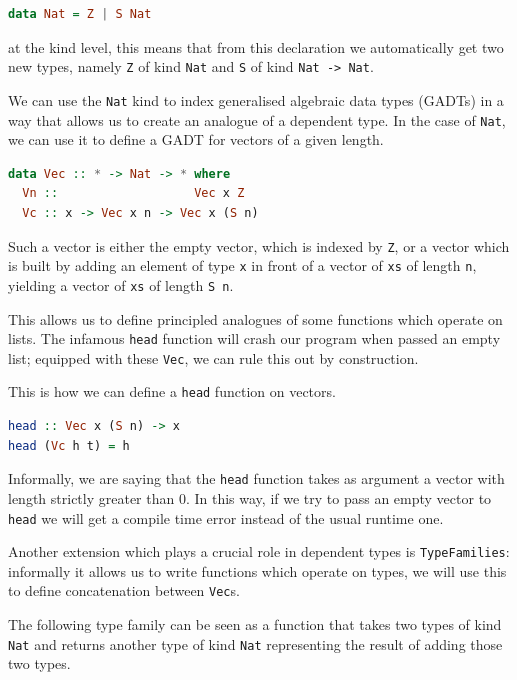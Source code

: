 \documentclass[11pt]{article}
\begin{document}
\begin{lstlisting}[language=haskell]
data Nat = Z | S Nat
\end{lstlisting}

at the kind level, this means that from this declaration we automatically get two new types, namely \texttt{Z} of kind \texttt{Nat}
and \texttt{S} of kind \texttt{Nat\ -\textgreater{}\ Nat}.

We can use the \texttt{Nat} kind to index generalised algebraic data
types (GADTs) in a way that allows us to create an analogue of a
dependent type. In the case of \texttt{Nat}, we can use it to define a
GADT for vectors of a given length.

\begin{lstlisting}[language=haskell]
data Vec :: * -> Nat -> * where
  Vn ::                   Vec x Z
  Vc :: x -> Vec x n -> Vec x (S n)
\end{lstlisting}

Such a vector is either the empty vector, which is indexed by
\texttt{Z}, or a vector which is built by adding an element of
type \texttt{x} in front of a vector of \texttt{xs} of length \texttt{n},
yielding a vector of \texttt{xs} of length \texttt{S\ n}.

This allows us to define principled analogues of some functions which
operate on lists. The infamous \texttt{head} function will
crash our program when passed an empty list; equipped with these \texttt{Vec}, we can rule this
out by construction. 

This is how we can define a \texttt{head} function on vectors.

\begin{lstlisting}[language=haskell]
head :: Vec x (S n) -> x
head (Vc h t) = h
\end{lstlisting}

Informally, we are saying that the \texttt{head} function takes as
argument a vector with length strictly greater than 0. In this way, if we
try to pass an empty vector to \texttt{head} we will get a compile time
error instead of the usual runtime one.

Another extension which plays a crucial role in dependent types is
\texttt{TypeFamilies}: informally it allows us to write functions which operate on types, 
we will use this to define concatenation between \texttt{Vec}s.

The following type family can be seen as a function that takes two types
of kind \texttt{Nat} and returns another type of kind \texttt{Nat}
representing the result of adding those two types.
\end{document}
